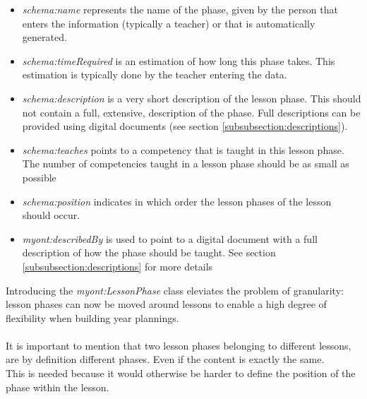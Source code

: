 \documentclass[a4paper]{report}
\begin{document}
    \begin{itemize}
        \item \emph{schema:name} represents the name of the phase, given by the person that enters the information (typically a teacher) or that is automatically generated.
        \item \emph{schema:timeRequired} is an estimation of how long this phase takes. This estimation is typically done by the teacher entering the data.
        \item \emph{schema:description} is a very short description of the lesson phase. This should not contain a full, extensive, description of the phase. Full descriptions can be provided using digital documents (see section \ref{subsubsection:descriptions}).
        \item \emph{schema:teaches} points to a competency that is taught in this lesson phase. The number of competencies taught in a lesson phase should be as small as possible
        \item \emph{schema:position} indicates in which order the lesson phases of the lesson should occur.
        \item \emph{myont:describedBy} is used to point to a digital document with a full description of how the phase should be taught. See section \ref{subsubsection:descriptions} for more details
    \end{itemize}
    Introducing the \textit{myont:LessonPhase} class eleviates the problem of granularity: lesson phases can now be moved around lessons to enable a high degree of flexibility when building year plannings.\\ \\
    It is important to mention that two lesson phases belonging to different lessons, are by definition different phases. Even if the content is exactly the same.\\
    This is needed because it would otherwise be harder to define the position of the phase within the lesson.
\end{document}
